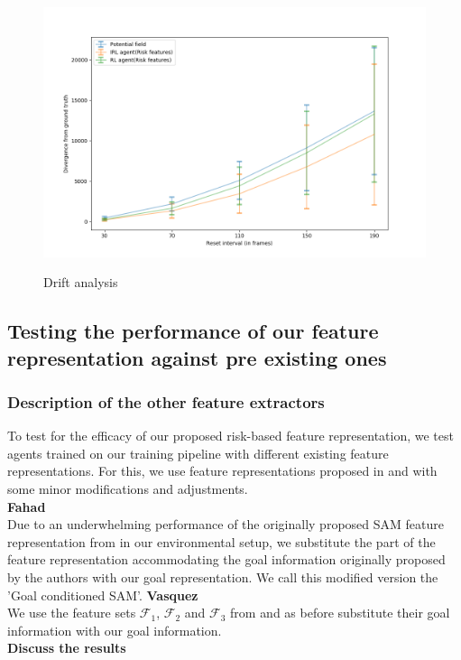 \begin{figure}[!htbp]
	\centering
	\caption{Drift analysis}
	\includegraphics[width=0.6\linewidth]{plots/inter_method/drift_pf_irl_rl.png}
	\label{fig:inter_method-drift_analysis}
\end{figure}

\subsection*{Testing the performance of our feature representation against pre existing ones}
\subsubsection*{Description of the other feature extractors}
To test for the efficacy of our proposed risk-based feature representation, we test agents trained on our training pipeline with different existing feature representations. For this, we use feature representations proposed in \cite{fahadLearningHowPedestrians2018a} and \cite{vasquezInverseReinforcementLearning2014a} with some minor modifications and adjustments.\\
\textbf{Fahad}\\
Due to an underwhelming performance of the originally proposed SAM feature representation from \cite{fahadLearningHowPedestrians2018a} in our environmental setup, we substitute the part of the feature representation accommodating the goal information originally proposed by the authors with our goal representation. We call this modified version the 'Goal conditioned SAM'.
\textbf{Vasquez}\\
We use the feature sets $\mathcal{F}_1$, $\mathcal{F}_2$ and $\mathcal{F}_3$ from \cite{vasquezInverseReinforcementLearning2014a} and as before substitute their goal information with our goal information.\\
\textbf{Discuss the results}

